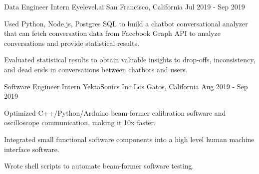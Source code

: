 

\begin{cventries}

  \cventry
    {Data Engineer Intern} %
    {Eyelevel.ai} %
    {San Francisco, California} %
    {Jul 2019 - Sep 2019} %
    {
	\begin{cvitems} %
      	\item Used Python, Node.js, Postgres SQL to build a chatbot conversational analyzer that can fetch conversation data from Facebook Graph API to analyze conversations and provide statistical results.
      	\item Evaluated statistical results to obtain valuable insights to drop-offs, inconsistency, and dead ends in conversations between chatbots and users.
	\end{cvitems}
    }
    
  \cventry
    {Software Engineer Intern} %
    {YektaSonics Inc} %
    {Los Gatos, California} %
    {Aug 2019 - Sep 2019} %
    {
	\begin{cvitems} %
      	\item Optimized C++/Python/Arduino beam-former calibration software and oscilloscope communication, making it 10x faster.
      	\item Integrated small functional software components into a high level human machine interface software. 
      	\item Wrote shell scripts to automate beam-former software testing.
	\end{cvitems}
    }
    

\end{cventries}
